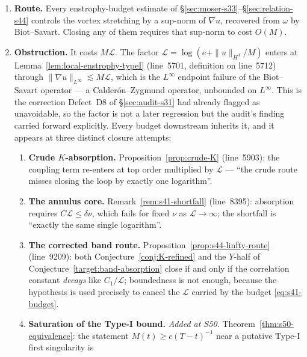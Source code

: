 \documentclass[11pt]{article}
\theoremstyle{definition}
\theoremstyle{remark}
\begin{document}
\begin{enumerate}[label=(\alph*),leftmargin=2.2em]
  \item \textbf{Route.} Every enstrophy-budget estimate of
    \S\ref{sec:moser-s33}--\S\ref{sec:relation-s44} controls the vortex
    stretching by a sup-norm of $\nabla u$, recovered from $\omega$ by
    Biot--Savart. Closing any of them requires that sup-norm to cost $O(M)$.
  \item \textbf{Obstruction.} It costs $M\mathcal{L}$. The factor
    $\mathcal{L}=\log(e+\|u\|_{H^3}/M)$ enters at
    Lemma~\ref{lem:local-enstrophy-typeI} (line~5701, definition on
    line~5712) through $\|\nabla u\|_{L^\infty}\lesssim M\mathcal{L}$, which
    is the $L^\infty$ endpoint failure of the Biot--Savart operator --- a
    Calder\'on--Zygmund operator, unbounded on $L^\infty$. This is the
    correction Defect~D8 of \S\ref{sec:audit-s31} had already flagged as
    unavoidable, so the factor is not a later regression but the audit's
    finding carried forward explicitly. Every budget downstream inherits it,
    and it appears at three distinct closure attempts:
    \begin{enumerate}[label=\textup{(\roman*)},leftmargin=2.6em]
      \item \textbf{Crude $K$-absorption.} Proposition~\ref{prop:crude-K}
        (line~5903): the coupling term re-enters at top order multiplied by
        $\mathcal{L}$ --- ``the crude route misses closing the loop by exactly
        one logarithm''.
      \item \textbf{The annulus core.} Remark~\ref{rem:s41-shortfall}
        (line~8395): absorption requires $C\mathcal{L}\leq\delta\nu$, which
        fails for fixed $\nu$ as $\mathcal{L}\to\infty$; the shortfall is
        ``exactly the same single logarithm''.
      \item \textbf{The corrected band route.}
        Proposition~\ref{prop:s44-linfty-route} (line~9209): both
        Conjecture~\ref{conj:K-refined} and the $Y$-half of
        Conjecture~\ref{target:band-absorption} close if and only if the
        correlation constant \emph{decays} like $C_1/\mathcal{L}$;
        boundedness is not enough, because the hypothesis is used precisely
        to cancel the $\mathcal{L}$ carried by the budget
        \eqref{eq:s41-budget}.
      \item \textbf{Saturation of the Type-I bound.} \emph{Added at S50.}
        Theorem~\ref{thm:s50-equivalence}: the statement
        $M(t)\geq c(T-t)^{-1}$ near a putative Type-I first singularity is

\end{enumerate}
\end{enumerate}
\end{document}
